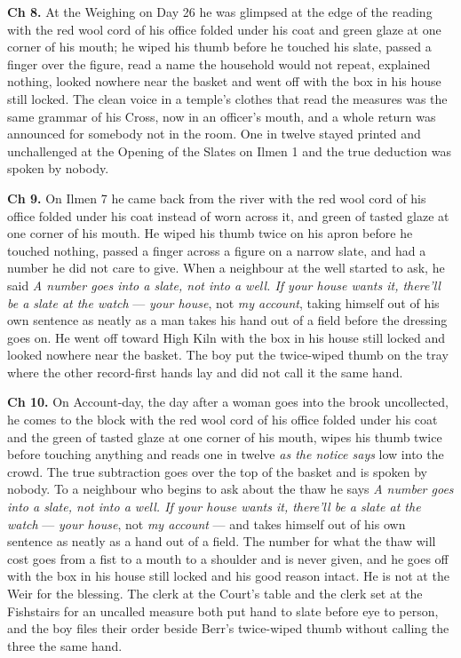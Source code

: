 \documentclass{design/chronicle}
\begin{document}
{\textbf{Ch 8.} At the Weighing on Day 26 he was glimpsed at the edge of the reading with the red wool cord of his office folded under his coat and green glaze at one corner of his mouth; he wiped his thumb before he touched his slate, passed a finger over the figure, read a name the household would not repeat, explained nothing, looked nowhere near the basket and went off with the box in his house still locked. The clean voice in a temple’s clothes that read the measures was the same grammar of his Cross, now in an officer’s mouth, and a whole return was announced for somebody not in the room. One in twelve stayed printed and unchallenged at the Opening of the Slates on Ilmen 1 and the true deduction was spoken by nobody.

\textbf{Ch 9.} On Ilmen 7 he came back from the river with the red wool cord of his office folded under his coat instead of worn across it, and green of tasted glaze at one corner of his mouth. He wiped his thumb twice on his apron before he touched nothing, passed a finger across a figure on a narrow slate, and had a number he did not care to give. When a neighbour at the well started to ask, he said \emph{A number goes into a slate, not into a well. If your house wants it, there’ll be a slate at the watch} --- \emph{your house}, not \emph{my account}, taking himself out of his own sentence as neatly as a man takes his hand out of a field before the dressing goes on. He went off toward High Kiln with the box in his house still locked and looked nowhere near the basket. The boy put the twice-wiped thumb on the tray where the other record-first hands lay and did not call it the same hand.

\textbf{Ch 10.} On Account-day, the day after a woman goes into the brook uncollected, he comes to the block with the red wool cord of his office folded under his coat and the green of tasted glaze at one corner of his mouth, wipes his thumb twice before touching anything and reads one in twelve \emph{as the notice says} low into the crowd. The true subtraction goes over the top of the basket and is spoken by nobody. To a neighbour who begins to ask about the thaw he says \emph{A number goes into a slate, not into a well. If your house wants it, there’ll be a slate at the watch} --- \emph{your house}, not \emph{my account} --- and takes himself out of his own sentence as neatly as a hand out of a field. The number for what the thaw will cost goes from a fist to a mouth to a shoulder and is never given, and he goes off with the box in his house still locked and his good reason intact. He is not at the Weir for the blessing. The clerk at the Court’s table and the clerk set at the Fishstairs for an uncalled measure both put hand to slate before eye to person, and the boy files their order beside Berr’s twice-wiped thumb without calling the three the same hand.

}
\end{document}
